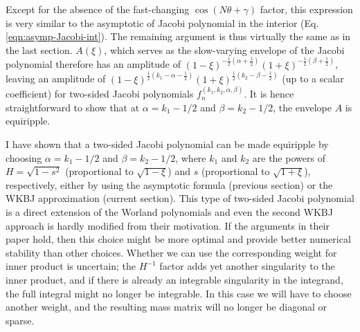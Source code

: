 %
Except for the absence of the fast-changing $\cos(N\theta + \gamma)$ factor, this expression is very similar to the asymptotic of Jacobi polynomial in the interior (Eq. \ref{eqn:asymp-Jacobi-int}). The remaining argument is thus virtually the same as in the last section. 
$A(\xi)$, which serves as the slow-varying envelope of the Jacobi polynomial therefore has an amplitude of $(1 - \xi)^{-\frac{1}{2}(\alpha + \frac{1}{2})} (1 + \xi)^{-\frac{1}{2}(\beta + \frac{1}{2})}$, leaving an amplitude of $(1 - \xi)^{\frac{1}{2}(k_1 - \alpha - \frac{1}{2})} (1 + \xi)^{\frac{1}{2}(k_2 - \beta - \frac{1}{2})}$ (up to a scalar coefficient) for two-sided Jacobi polynomials $f_n^{(k_1, k_2, \alpha, \beta)}$. It is hence straightforward to show that at $\alpha = k_1 - 1/2$ and $\beta = k_2 - 1/2$, the envelope $A$ is equiripple.

I have shown that a two-sided Jacobi polynomial can be made equiripple by choosing $\alpha = k_1 - 1/2$ and $\beta = k_2 - 1/2$, where $k_1$ and $k_2$ are the powers of $H = \sqrt{1 - s^2}$ (proportional to $\sqrt{1 - \xi}$) and $s$ (proportional to $\sqrt{1 + \xi}$), respectively, either by using the asymptotic formula (previous section) or the WKBJ approximation (current section). 
This type of two-sided Jacobi polynomial is a direct extension of the Worland polynomials \citep{livermore_spectral_2007} and even the second WKBJ approach is hardly modified from their motivation. If the arguments in their paper hold, then this choice might be more optimal and provide better numerical stability than other choices. Whether we can use the corresponding weight for inner product is uncertain; the $H^{-1}$ factor adds yet another singularity to the inner product, and if there is already an integrable singularity in the integrand, the full integral might no longer be integrable. In this case we will have to choose another weight, and the resulting mass matrix will no longer be diagonal or sparse.
